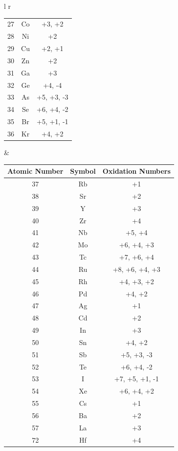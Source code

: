 \begin{table}[ht]
\begin{tabular}{l r}
\begin{tabular}{c c c}
            27 & Co & +3, +2 \\
            28 & Ni & +2 \\
            29 & Cu & +2, +1 \\
            30 & Zn & +2 \\
            31 & Ga & +3 \\
            32 & Ge & +4, -4 \\
            33 & As & +5, +3, -3 \\
            34 & Se & +6, +4, -2 \\
            35 & Br & +5, +1, -1 \\
            36 & Kr & +4, +2 \\
            
        \end{tabular} & 
        \begin{tabular}{c c c}
            Atomic Number & Symbol & Oxidation Numbers \\
            \hline
            37 & Rb & +1 \\
            38 & Sr & +2 \\
            39 & Y & +3 \\
            40 & Zr & +4 \\
            41 & Nb & +5, +4 \\
            42 & Mo & +6, +4, +3 \\
            43 & Tc & +7, +6, +4 \\
            44 & Ru & +8, +6, +4, +3 \\
            45 & Rh & +4, +3, +2 \\
            46 & Pd & +4, +2 \\
            47 & Ag & +1 \\
            48 & Cd & +2 \\
            49 & In & +3 \\
            50 & Sn & +4, +2 \\
            51 & Sb & +5, +3, -3 \\
            52 & Te & +6, +4, -2 \\
            53 & I & +7, +5, +1, -1 \\
            54 & Xe & +6, +4, +2 \\
            55 & Cs & +1 \\
            56 & Ba & +2 \\
            57 & La & +3 \\
            72 & Hf & +4 \\

\end{tabular}
\end{tabular}
\end{table}
